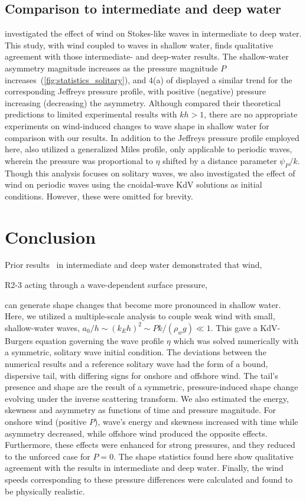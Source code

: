 \documentclass{jfm}
\begin{document}
\subsection{Comparison to intermediate and deep water}
 investigated the effect of
wind on Stokes-like waves in intermediate to deep water.
This study, with wind coupled to waves in shallow water, finds
qualitative agreement with those intermediate- and deep-water results.
The shallow-water asymmetry magnitude increases as the pressure
magnitude $P$ increases~(\cref{fig:statistics_solitary}), and \figname{}
4(a) of \citet{zdyrski2020wind} displayed a similar trend for the
corresponding Jeffreys pressure profile, with positive (negative)
pressure increasing (decreasing) the asymmetry.
Although \citet{zdyrski2020wind} compared their theoretical
predictions to limited experimental results with $kh > 1$, there are no
appropriate experiments on wind-induced changes to wave shape in shallow
water for comparison with our results.
In addition to the Jeffreys pressure profile employed here,
\citet{zdyrski2020wind} also utilized a generalized Miles profile,
only applicable to periodic waves, wherein the pressure was proportional
to $\eta$ shifted by a distance parameter $\psi_P/k$.
Though this analysis focuses on solitary waves, we also investigated the
effect of wind on periodic waves using the cnoidal-wave KdV solutions as
initial conditions.
However, these were omitted for brevity.

\section{Conclusion}
Prior results~\citep{zdyrski2020wind} in intermediate and deep water
demonstrated that wind,
\begin{LineLabel}{R2-3}
acting through a wave-dependent surface pressure,
\end{LineLabel}
can generate shape changes that become more pronounced in
shallow water.
Here, we utilized a multiple-scale analysis to couple weak wind with
small, shallow-water waves, \ie{} $a_0/h \sim (k_E h)^2 \sim P k/(\rho_w
g) \ll 1$.
This gave a KdV-Burgers equation governing the wave profile $\eta$
which was solved numerically with a symmetric, solitary wave initial
condition.
The deviations between the numerical results and a reference solitary
wave had the form of a bound, dispersive tail, with differing signs for
onshore and offshore wind.
The tail's presence and shape are the result of a symmetric,
pressure-induced shape change evolving under the inverse scattering
transform.
We also estimated the energy, skewness and
asymmetry as functions of time and pressure magnitude.
For onshore wind (positive $P$), wave's energy and skewness increased
with time while asymmetry decreased, while offshore wind produced the
opposite effects.
Furthermore, these effects were enhanced for strong pressures, and they
reduced to the unforced case for $P=0$.
The shape statistics found here show qualitative agreement with the
results in intermediate and deep water.
Finally, the wind speeds corresponding to these pressure differences
were calculated and found to be physically realistic.
\end{document}
